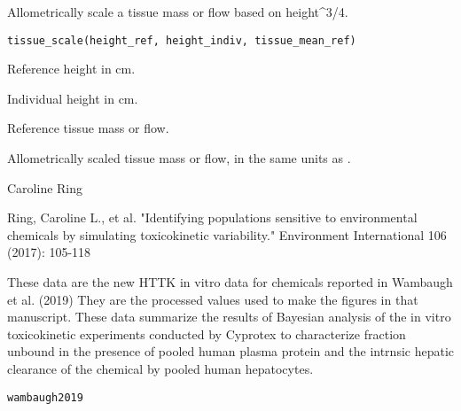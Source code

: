 \documentclass[a4paper]{book}
\begin{document}
%
\begin{Description}\relax
Allometrically scale a tissue mass or flow based on height\textasciicircum{}3/4.
\end{Description}
%
\begin{Usage}
\begin{verbatim}
tissue_scale(height_ref, height_indiv, tissue_mean_ref)
\end{verbatim}
\end{Usage}
%
\begin{Arguments}
\begin{ldescription}
\item[\code{height\_ref}] Reference height in cm.

\item[\code{height\_indiv}] Individual height in cm.

\item[\code{tissue\_mean\_ref}] Reference tissue mass or flow.
\end{ldescription}
\end{Arguments}
%
\begin{Value}
Allometrically scaled tissue mass or flow, in the same units as
.
\end{Value}
%
\begin{Author}\relax
Caroline Ring
\end{Author}
%
\begin{References}\relax
Ring, Caroline L., et al. "Identifying populations sensitive to 
environmental chemicals by simulating toxicokinetic variability." Environment 
International 106 (2017): 105-118
\end{References}
%
\begin{Description}\relax
These data are the new HTTK in vitro data for chemicals reported in Wambaugh
et al. (2019) They
are the processed values used to make the figures in that manuscript.
These data summarize the results of Bayesian analysis of the in vitro
toxicokinetic experiments conducted by Cyprotex to characterize fraction
unbound in the presence of pooled human plasma protein and the intrnsic
hepatic clearance of the chemical by pooled human hepatocytes.
\end{Description}
%
\begin{Usage}
\begin{verbatim}
wambaugh2019
\end{verbatim}
\end{Usage}
\end{document}

